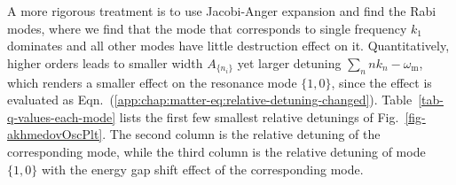 A more rigorous treatment is to use Jacobi-Anger expansion and find the Rabi modes, where we find that the mode that corresponds to single frequency $k_1$ dominates and all other modes have little destruction effect on it. Quantitatively, higher orders leads to smaller width $A_{\{n_i\}}$ yet larger detuning $\sum_{n} nk_n-\omega_{\mathrm m}$, which renders a smaller effect on the resonance mode $\{1,0\}$, since the effect is evaluated as Eqn.~(\ref{app:chap:matter-eq:relative-detuning-changed}).
Table~\ref{tab-q-values-each-mode} lists the first few smallest relative detunings of Fig.~\ref{fig-akhmedovOscPlt}. The second column is the relative detuning of the corresponding mode, while the third column is the relative detuning of mode $\{1,0\}$ with the energy gap shift effect of the corresponding mode.






